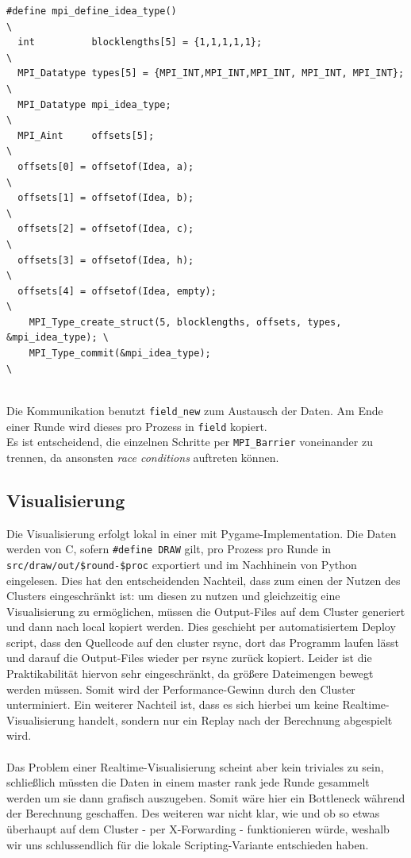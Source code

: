 \begin{verbatim}
#define mpi_define_idea_type()                                               \
  int          blocklengths[5] = {1,1,1,1,1};                                \
  MPI_Datatype types[5] = {MPI_INT,MPI_INT,MPI_INT, MPI_INT, MPI_INT};       \
  MPI_Datatype mpi_idea_type;                                                \
  MPI_Aint     offsets[5];                                                   \
  offsets[0] = offsetof(Idea, a);                                            \
  offsets[1] = offsetof(Idea, b);                                            \
  offsets[2] = offsetof(Idea, c);                                            \
  offsets[3] = offsetof(Idea, h);                                            \
  offsets[4] = offsetof(Idea, empty);                                        \
    MPI_Type_create_struct(5, blocklengths, offsets, types, &mpi_idea_type); \
    MPI_Type_commit(&mpi_idea_type);                                         \
\end{verbatim}
\quad \\
Die Kommunikation benutzt \texttt{field\_new} zum Austausch der Daten. Am Ende einer Runde wird dieses pro Prozess in \texttt{field} kopiert. \\
Es ist entscheidend, die einzelnen Schritte per \texttt{MPI\_Barrier} voneinander zu trennen, da ansonsten \textit{race conditions} auftreten können.

\subsection{Visualisierung}
Die Visualisierung erfolgt lokal in einer mit Pygame-Implementation. 
Die Daten werden von C, sofern \texttt{\#define DRAW} gilt, pro Prozess pro Runde in \texttt{src/draw/out/\$round-\$proc} exportiert und im Nachhinein von Python eingelesen. 
Dies hat den entscheidenden Nachteil, dass zum einen der Nutzen des Clusters eingeschränkt ist: 
um diesen zu nutzen und gleichzeitig eine Visualisierung zu ermöglichen, müssen die Output-Files auf dem Cluster generiert und dann nach local kopiert werden. 
Dies geschieht per automatisiertem Deploy script, dass den Quellcode auf den cluster rsync, dort das Programm laufen lässt und darauf die Output-Files wieder per rsync zurück kopiert.
Leider ist die Praktikabilität hiervon sehr eingeschränkt, da größere Dateimengen bewegt werden müssen. 
Somit wird der Performance-Gewinn durch den Cluster unterminiert.
Ein weiterer Nachteil ist, dass es sich hierbei um keine Realtime-Visualisierung handelt, sondern nur ein Replay nach der Berechnung abgespielt wird. \\
\quad \\
Das Problem einer Realtime-Visualisierung scheint aber kein triviales zu sein, 
schließlich müssten die Daten in einem master rank jede Runde gesammelt werden um sie dann grafisch auszugeben. 
Somit wäre hier ein Bottleneck während der Berechnung geschaffen.
Des weiteren war nicht klar, wie und ob so etwas überhaupt auf dem Cluster - per X-Forwarding - funktionieren würde, weshalb wir uns schlussendlich für die lokale Scripting-Variante entschieden haben.
\newpage


